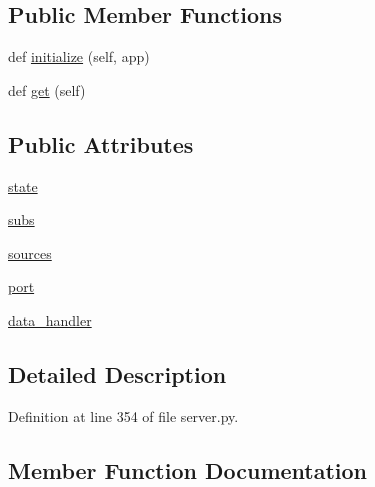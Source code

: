 \subsection*{Public Member Functions}
\begin{DoxyCompactItemize}
\item 
def \hyperlink{classparlai_1_1mturk_1_1webapp_1_1server_1_1WorkerListHandler_ad375655741a045539a790aa1eb8878df}{initialize} (self, app)
\item 
def \hyperlink{classparlai_1_1mturk_1_1webapp_1_1server_1_1WorkerListHandler_a3383de3fd04a665c4a8515f5b24298e0}{get} (self)
\end{DoxyCompactItemize}
\subsection*{Public Attributes}
\begin{DoxyCompactItemize}
\item 
\hyperlink{classparlai_1_1mturk_1_1webapp_1_1server_1_1WorkerListHandler_a148a2a0c1abac1c1e910053612a68100}{state}
\item 
\hyperlink{classparlai_1_1mturk_1_1webapp_1_1server_1_1WorkerListHandler_a45a7642674a9e26e63898339dd8f77eb}{subs}
\item 
\hyperlink{classparlai_1_1mturk_1_1webapp_1_1server_1_1WorkerListHandler_ad75402572f58d507dacf6db95960239e}{sources}
\item 
\hyperlink{classparlai_1_1mturk_1_1webapp_1_1server_1_1WorkerListHandler_a92bb448ef812ff9ff294d703078c5cb0}{port}
\item 
\hyperlink{classparlai_1_1mturk_1_1webapp_1_1server_1_1WorkerListHandler_ac2d150c97af3040146f49dc7d9f178c1}{data\+\_\+handler}
\end{DoxyCompactItemize}


\subsection{Detailed Description}


Definition at line 354 of file server.\+py.



\subsection{Member Function Documentation}
\mbox{\label{classparlai_1_1mturk_1_1webapp_1_1server_1_1WorkerListHandler_a3383de3fd04a665c4a8515f5b24298e0}} 
